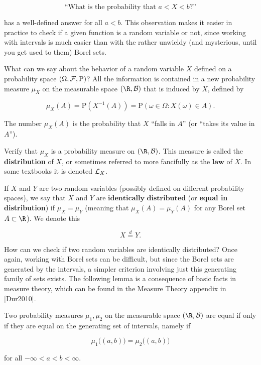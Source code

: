 \[
\textrm{``What is the probability that $a < X < b$?''}
\]

\noindent has a well-defined answer for all $a<b$. This
observation makes it easier in practice to check if a
given function is a random variable or not, since
working with intervals is much easier than with the
rather unwieldy (and mysterious, until you get used to
them) Borel sets.

What can we say about the behavior of a random
variable $X$ defined on a probability space
$(\Omega, {\cal F}, \mathrm{P})$? All the information
is contained in a new probability measure $\mu_X$ on
the measurable space $(\R, {\cal B})$ that is induced
by $X$, defined by

\[
\mu_X(A) = \mathrm{P}(X^{-1}(A)) = \mathrm{P}(\omega \in \Omega : X(\omega) \in A).
\]

\noindent The number $\mu_X(A)$ is the probability that $X$
``falls in $A$'' (or ``takes its value in $A$'').

\begin{xexercise}
Verify that $\mu_X$ is a probability measure on
$(\R, {\cal B})$. This measure is called the
\textbf{distribution} of $X$, or sometimes referred
to more fancifully as the $\textbf{law}$ of $X$. In
some textbooks it is denoted ${\cal L}_X$.
\end{xexercise}

\begin{defn}
If $X$ and $Y$ are two random variables (possibly
defined on different probability spaces), we say that
$X$ and $Y$ are $\textbf{identically distributed}$
(or \textbf{equal in distribution}) if $\mu_X = \mu_Y$
(meaning that $\mu_X(A) = \mu_Y(A)$ for any Borel set
$A\subset \R$). We denote this

\[
X \stackrel{d}{=} Y.
\]

\end{defn}

\noindent How can we check if two random variables are
identically distributed? Once again, working with
Borel sets can be difficult, but since the Borel sets
are generated by the intervals, a simpler criterion
involving just this generating family of sets exists.
The following lemma is a consequence of basic facts in
measure theory, which can be found in the Measure
Theory appendix in [Dur2010].

\begin{lem}
Two probability measures $\mu_1, \mu_2$ on the
measurable space $(\R, {\cal B})$ are equal if only
if they are equal on the generating set of intervals,
namely if

\[
\mu_1\big((a,b)\big) = \mu_2\big((a,b)\big)
\]

\noindent for all $-\infty < a<b < \infty$.
\end{lem}
